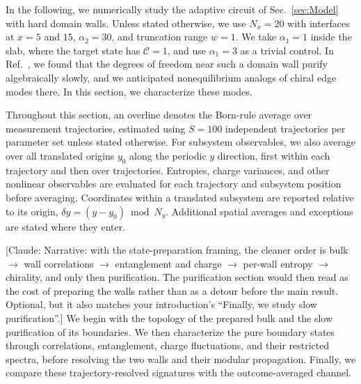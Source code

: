 \documentclass[aps,prb,10pt,twocolumn,superscriptaddress,longbibliography,floatfix]{revtex4-2}
\newcommand{\mc}[1]{\mathcal{#1}}
\newcommand{\claudecom}[1]{{\color{ForestGreen}[Claude: #1]}}
\begin{document}
In the following, we numerically study the adaptive circuit of Sec.~\ref{sec:Model} with hard domain walls. Unless stated otherwise, we use $N_x=20$ with interfaces at $x=5$ and $15$, $\alpha_2=30$, and truncation range $w=1$. We take $\alpha_1=1$ inside the slab, where the target state has $\mc C=1$, and use $\alpha_1=3$ as a trivial control. In Ref.~\cite{BhuiyanPanJian2026}, we found that the degrees of freedom near such a domain wall purify algebraically slowly, and we anticipated nonequilibrium analogs of chiral edge modes there. In this section, we characterize these modes.
{\color{blue}
Throughout this section, an overline denotes the Born-rule average over measurement trajectories, estimated using $S=100$ independent trajectories per parameter set unless stated otherwise. For subsystem observables, we also average over all translated origins $y_0$ along the periodic $y$ direction, first within each trajectory and then over trajectories. Entropies, charge variances, and other nonlinear observables are evaluated for each trajectory and subsystem position before averaging. Coordinates within a translated subsystem are reported relative to its origin, $\delta y=(y-y_0)\bmod N_y$. Additional spatial averages and exceptions are stated where they enter.

\claudecom{Narrative: with the state-preparation framing, the cleaner order is bulk $\to$ wall correlations $\to$ entanglement and charge $\to$ per-wall entropy $\to$ chirality, and only then purification. The purification section would then read as the cost of preparing the walls rather than as a detour before the main result. Optional, but it also matches your introduction's ``Finally, we study slow purification''.} We begin with the topology of the prepared bulk and the slow purification of its boundaries. We then characterize the pure boundary states through correlations, entanglement, charge fluctuations, and their restricted spectra, before resolving the two walls and their modular propagation. Finally, we compare these trajectory-resolved signatures with the outcome-averaged channel.
}
\end{document}
